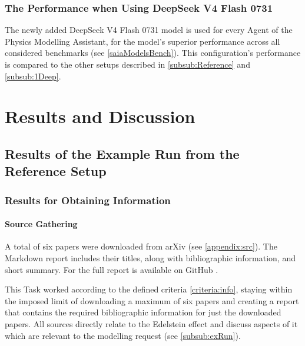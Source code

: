 \documentclass[
	fontsize = 11pt,
	paper = a4,
	draft = false,
	twoside = true,
	titlepage = false
]{scrartcl}
\numberwithin{equation}{subsection}
\begin{document}
	\subsubsection{The Performance when Using DeepSeek V4 Flash 0731} \label{subsub:allDeep}
	The newly added DeepSeek V4 Flash 0731 model is used for every \gls{Agent} of the Physics Modelling Assistant, for the model's superior performance across all considered benchmarks (see \autoref{saiaModelsBench}). This configuration's performance is compared to the other setups described in \autoref{subsub:Reference} and \autoref{subsub:1Deep}.
	
	\FloatBarrier
	\pagebreak
	\section{Results and Discussion}	
	\subsection{Results of the Example Run from the Reference Setup} \label{sub:exRunRes}
	\subsubsection{Results for Obtaining Information} \label{results:Info}
	\paragraph{Source Gathering} \label{par:src}
	A total of six papers were downloaded from arXiv (see \autoref{appendix:src}). The Markdown report includes their titles, along with bibliographic information, and short summary. For the full report is available on GitHub \autocite{gitSources}.
	
	This Task worked according to the defined criteria \autoref{criteria:info}, staying within the imposed limit of downloading a maximum of six papers and creating a report that contains the required bibliographic information for just the downloaded papers. All sources directly relate to the Edelstein effect and discuss aspects of it which are relevant to the modelling request (see \autoref{subsub:exRun}).
	
\end{document}
